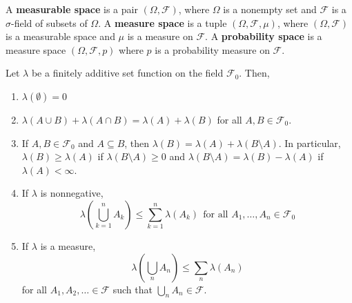 \begin{defn} A \textbf{measurable space} is a pair
\(\left(\Omega,\mathcal{F}\right)\), where \(\Omega\) is a nonempty set and \(\mathcal{F}\) is a \(\sigma\)-field of subsets of
\(\Omega\). A \textbf{measure space} is a tuple \(\left(\Omega,\mathcal{F},\mu\right)\),
where \(\left(\Omega,\mathcal{F}\right)\) is a measurable space and \(\mu\) is a measure
on \(\mathcal{F}\). A \textbf{probability space} is a measure space
\(\left(\Omega,\mathcal{F},p\right)\) where \(p\) is a probability measure on \(\mathcal{F}\).
\end{defn}
\begin{prop} Let \(\lambda\) be a finitely additive set function 
on the field \(\mathcal{F}_0\). Then,
\begin{enumerate}
			\item \label{proposition:measure of empty set is 0}
\(\lambda(\emptyset)=0\)
			\item \label{proposition:inclusion-exclusion}
\(\lambda(A\cup B)+\lambda(A\cap B)=\lambda(A)+\lambda(B)\) for all
\(A, B\in\mathcal{F}_0\).
			\item \label{proposition:monotonicity of additive set functions} If
\(A, B\in\mathcal{F}_0\) and \(A\subseteq B\), then
\(\lambda(B)=\lambda(A)+\lambda(B\setminus A)\). In particular,
\(\lambda(B)\geq\lambda(A)\) if \(\lambda(B\setminus A)\geq0\) and
\(\lambda(B\setminus A)=\lambda(B)-\lambda(A)\) if \(\lambda(A)<\infty\).
			\item \label{proposition:properties of additive set functions 1-4}If
\(\lambda\) is nonnegative,
			\[ \lambda\left(\bigcup_{k=1}^{n}A_{k}\right)\leq\sum_{k=1}^{n}\lambda(A_{k}) ~~\text{
for all } A_{1},\dots,A_{n}\in\mathcal{F}_0
			\]
			\item \label{proposition:properties of additive set functions 1-5}If
\(\lambda\) is a measure,
			\[ \lambda\left(\bigcup_{n}A_{n}\right)\leq\sum_{n}\lambda(A_{n})
			\] for all \(A_{1},A_{2},\dots\in\mathcal{F}\) such that
\(\bigcup_{n}A_{n}\in\mathcal{F}\).
		\end{enumerate}
\end{prop}
